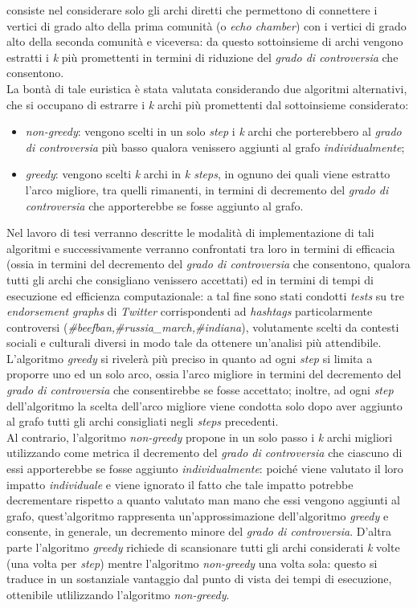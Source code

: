 \documentclass[trieste,12pt]{toptesi}
\begin{document}
consiste nel considerare solo gli archi diretti che permettono di connettere i vertici di grado alto della prima comunità (o \textit{echo chamber}) con i vertici di grado alto della seconda comunità e viceversa: da questo sottoinsieme di archi vengono estratti i \textit{k} più promettenti in termini di riduzione del \textit{grado di controversia} che consentono.\\La bontà di tale euristica è stata valutata considerando due algoritmi alternativi, che si occupano di estrarre i \textit{k} archi più promettenti dal sottoinsieme considerato: 
\begin{itemize}
\item \textit{non-greedy}: vengono scelti in un solo \textit{step} i \textit{k} archi che porterebbero al \textit{grado di controversia} più basso qualora venissero aggiunti al grafo \textit{individualmente};
\item \textit{greedy}: vengono scelti \textit{k} archi in \textit{k steps}, in ognuno dei quali viene estratto l'arco migliore, tra quelli rimanenti, in termini di decremento del \textit{grado di controversia} che apporterebbe se fosse aggiunto al grafo.
\end{itemize}
Nel lavoro di tesi verranno descritte le modalità di implementazione di tali algoritmi e successivamente verranno confrontati tra loro in termini di efficacia (ossia in termini del decremento del \textit{grado di controversia} che consentono, qualora tutti gli archi che consigliano venissero accettati) ed in termini di tempi di esecuzione ed efficienza computazionale: a tal fine sono stati condotti \textit{tests} su tre \textit{endorsement graphs} di \textit{Twitter} corrispondenti ad \textit{hashtags} particolarmente controversi (\textit{\#beefban,\#russia\_march,\#indiana}), volutamente scelti da contesti sociali e culturali diversi in modo tale da ottenere un'analisi più attendibile.\\L'algoritmo \textit{greedy} si rivelerà più preciso in quanto ad ogni \textit{step} si limita a proporre uno ed un solo arco, ossia l'arco migliore in termini del decremento del \textit{grado di controversia} che consentirebbe se fosse accettato; inoltre, ad ogni \textit{step} dell'algoritmo la scelta dell'arco migliore viene condotta solo dopo aver aggiunto al grafo tutti gli archi consigliati negli \textit{steps} precedenti.\\Al contrario, l'algoritmo \textit{non-greedy} propone in un solo passo i \textit{k} archi migliori utilizzando come metrica il decremento del \textit{grado di controversia} che ciascuno di essi apporterebbe se fosse aggiunto \textit{individualmente}: poiché viene valutato il loro impatto \textit{individuale} e viene ignorato il fatto che tale impatto potrebbe decrementare rispetto a quanto valutato man mano che essi vengono aggiunti al grafo, quest'algoritmo rappresenta un'approssimazione dell'algoritmo \textit{greedy} e consente, in generale, un decremento minore del \textit{grado di controversia}. D'altra parte l'algoritmo \textit{greedy} richiede di scansionare tutti gli archi considerati \textit{k} volte (una volta per \textit{step})  mentre l'algoritmo \textit{non-greedy} una volta sola: questo si traduce in un sostanziale vantaggio dal punto di vista dei tempi di esecuzione, ottenibile utlilizzando l'algoritmo \textit{non-greedy}.
\end{document}
